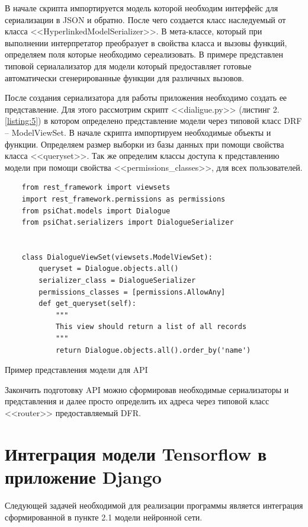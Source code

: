 В начале скрипта импортируется модель которой необходим интерфейс для сериализации в JSON и обратно. После чего создается класс наследуемый от класса <<HyperlinkedModelSerializer>>. В мета-классе, который при выполнении интерпретатор преобразует в свойства класса и вызовы функций, определяем поля которые необходимо сереализовать. В примере представлен типовой сериалализатор для модели который предоставляет готовые автоматически сгенерированные функции для различных вызовов. 

После создания сериализатора для работы приложения необходимо создать ее представление. Для этого рассмотрим скрипт <<dialigue.py>> (листинг 2.\ref{listing:5}) в котором определено представление модели через типовой класс DRF -- ModelViewSet. В начале скрипта импортируем необходимые объекты и функции. Определяем размер выборки из базы данных при помощи свойства класса <<queryset>>. Так же определим классы доступа к представлению модели при помощи свойства <<permissions\_classes>>, для всех пользователей. 

\begin{listing}[H]
\begin{verbatim}
    from rest_framework import viewsets
    import rest_framework.permissions as permissions
    from psiChat.models import Dialogue
    from psiChat.serializers import DialogueSerializer
    
    
    class DialogueViewSet(viewsets.ModelViewSet):
        queryset = Dialogue.objects.all()
        serializer_class = DialogueSerializer
        permissions_classes = [permissions.AllowAny]
        def get_queryset(self):
            """
            This view should return a list of all records
            """
            return Dialogue.objects.all().order_by('name')

\end{verbatim}
\caption{Пример представления модели для API}
\label{listing:5}
\end{listing}

Закончить подготовку API можно сформировав необходимые сериализаторы и представления и далее просто определить их адреса через типовой класс <<router>> предоставляемый DFR. 

\section{Интеграция модели Tensorflow в приложение Django}
Следующей задачей необходимой для реализации программы является интеграция сформированной в пункте 2.1 модели нейронной сети. 

